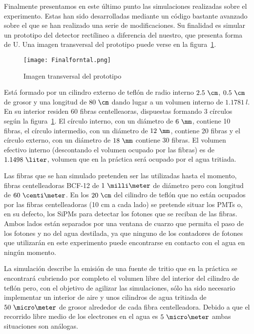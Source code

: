 Finalmente presentamos en este último punto las simulaciones realizadas sobre el experimento. Estas han sido desarrolladas mediante un código bastante avanzado sobre el que se han realizado una serie de modificaciones. Su finalidad es simular un prototipo del detector rectílineo a diferencia del nuestro, que presenta forma de U. Una imagen transversal del prototipo puede verse en la figura~\ref{imagenprototiposimulado}.

\begin{figure}[hbtp]
\centering
\texttt{[image: Finalforntal.png]}
\caption{Imagen transversal del prototipo\label{imagenprototiposimulado}}
\end{figure}


Está formado por un cilindro externo de teflón  de radio interno $2.5~\cm$, $0.5~\cm$ de grosor y una longitud de $80~\cm$ dando lugar a un volumen interno de $1.1781~l$. En su interior residen 60 fibras centelleaoras, dispuestas formando 3 círculos según la figura~\ref{imagenprototiposimulado}. El círculo interno, con un diámetro de $6~\mm$, contiene 10 fibras, el círculo intermedio, con un diámetro de $12~\mm$, contiene 20 fibras y el círculo externo, con un diámetro de $18~\mm$ contiene 30 fibras. El volumen efectivo interno (descontando el volumen ocupado por las fibras) es de $1.1498~\liter$, volumen que en la práctica será ocupado por el agua tritiada.

Las fibras que se han simulado pretenden ser las utilizadas hasta el momento, fibras centelleadoras BCF-12 de $1~\milli\meter$ de diámetro pero con longitud de $60~\centi\meter$. En los $20~\cm$  del cilindro de teflón que no están ocupados por las fibras centelleadoras (10 cm a cada lado) se pretende situar los PMTs o, en su defecto, los SiPMs para detectar los fotones que se reciban de las fibras. Ambos lados están separados por una ventana de cuarzo que permita el paso de los fotones y no del agua destilada, ya que ninguno de los contadores de fotones que utilizarán en este experimento puede encontrarse en contacto con el agua en ningún momento.

La simulación describe la emisión de una fuente de tritio que en la práctica se encontrará cubriendo por completo el volumen libre del interior del cilindro de teflón pero, con el objetivo de agilizar las simulaciones, sólo ha sido necesario implementar un interior de aire y unos cilindros de agua tritiada de $50~\micro\meter$ de grosor alrededor de cada fibra centelleadora. Debido a que el recorrido libre medio de los electrones en el agua es $5~\micro\meter$ ambas situaciones son análogas. 

